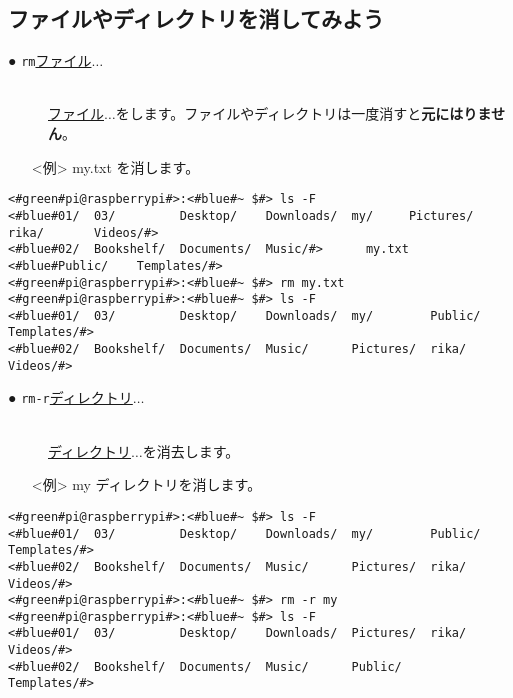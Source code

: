 \subsection{ファイルやディレクトリを消してみよう}
\begin{description}
\item[● \texttt{rm}\textvisiblespace \underline{ファイル}$\ldots$]\mbox{}\\
\underline{ファイル}$\ldots$をします。ファイルやディレクトリは一度消すと\textbf{元にはりません}。
\end{description}
\begin{itemize}
\item[<例>]my.txt を消します。
\end{itemize}
\begin{lstlisting}[caption=rmの例, label=rm]
<#green#pi@raspberrypi#>:<#blue#~ $#> ls -F
<#blue#01/  03/         Desktop/    Downloads/  my/     Pictures/  rika/       Videos/#>
<#blue#02/  Bookshelf/  Documents/  Music/#>      my.txt  <#blue#Public/    Templates/#>
<#green#pi@raspberrypi#>:<#blue#~ $#> rm my.txt
<#green#pi@raspberrypi#>:<#blue#~ $#> ls -F
<#blue#01/  03/         Desktop/    Downloads/  my/        Public/  Templates/#>
<#blue#02/  Bookshelf/  Documents/  Music/      Pictures/  rika/    Videos/#>
\end{lstlisting}
\begin{description}
\item[● \texttt{rm}\textvisiblespace \texttt{-r}\textvisiblespace \underline{ディレクトリ}$\ldots$]\mbox{}\\
\underline{ディレクトリ}$\ldots$を消去します。
\end{description}
\begin{itemize}
\item[<例>]my ディレクトリを消します。
\end{itemize}
\begin{lstlisting}[caption=rm -rの例, label=rm-R]
<#green#pi@raspberrypi#>:<#blue#~ $#> ls -F
<#blue#01/  03/         Desktop/    Downloads/  my/        Public/  Templates/#>
<#blue#02/  Bookshelf/  Documents/  Music/      Pictures/  rika/    Videos/#>
<#green#pi@raspberrypi#>:<#blue#~ $#> rm -r my
<#green#pi@raspberrypi#>:<#blue#~ $#> ls -F
<#blue#01/  03/         Desktop/    Downloads/  Pictures/  rika/       Videos/#>
<#blue#02/  Bookshelf/  Documents/  Music/      Public/    Templates/#>
\end{lstlisting}

